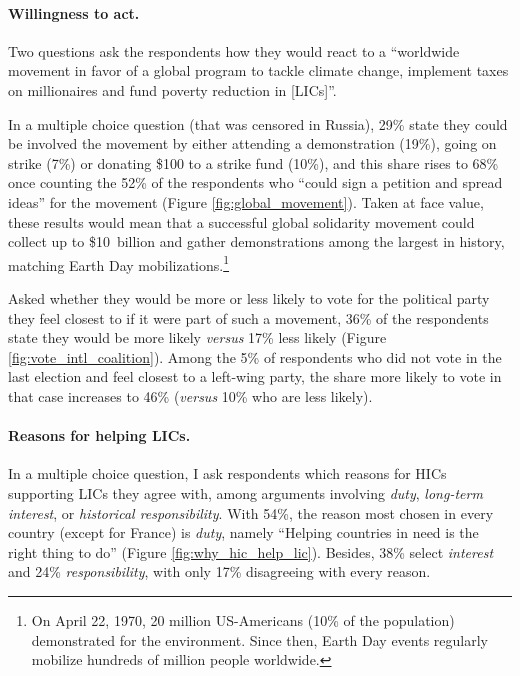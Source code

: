 \documentclass[12pt,english]{article}
\begin{document}
\begin{bibunit}
\paragraph{Willingness to act.}

Two questions ask the respondents how they would react to a ``worldwide movement in favor of a global program to tackle climate change, implement taxes on millionaires and fund poverty reduction in [LICs]''. 

In a multiple choice question (that was censored in Russia), 29\% state they could be involved the movement by either attending a demonstration (19\%), going on strike (7\%) or donating \$100 to a strike fund (10\%), and this share rises to 68\% once counting the 52\% of the respondents who ``could sign a petition and spread ideas'' for the movement (Figure \ref{fig:global_movement}). Taken at face value, these results would mean that a successful global solidarity movement could collect up to \$10~billion and gather demonstrations among the largest in history, matching Earth Day mobilizations.\footnote{On April 22, 1970, 20 million US-Americans (10\% of the population) demonstrated for the environment. Since then, Earth Day events regularly mobilize hundreds of million people worldwide.} 

Asked whether they would be more or less likely to vote for the political party they feel closest to if it were part of such a movement, 36\% of the respondents state they would be more likely \textit{versus} 17\% less likely (Figure \ref{fig:vote_intl_coalition}). Among the 5\% of respondents who did not vote in the last election and feel closest to a left-wing party, the share more likely to vote in that case increases to 46\% (\textit{versus} 10\% who are less likely). 


\paragraph{Reasons for helping LICs.}

In a multiple choice question, I ask respondents which reasons for HICs supporting LICs they agree with, among arguments involving \textit{duty}, \textit{long-term interest}, or \textit{historical responsibility}. With 54\%, the reason most chosen in every country (except for France) is \textit{duty}, namely ``Helping countries in need is the right thing to do'' (Figure \ref{fig:why_hic_help_lic}). Besides, 38\% select \textit{interest} and 24\% \textit{responsibility}, with only 17\% disagreeing with every reason.


\end{bibunit}
\end{document}
